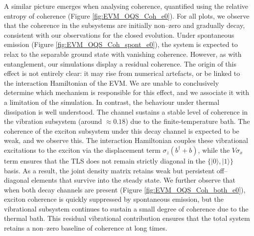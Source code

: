 \documentclass[11pt]{article}
\begin{document}
A similar picture emerges when analysing coherence, quantified using the relative entropy of coherence (Figure \ref{fig:EVM_OQS_Coh_e0}). For all plots, we observe that the coherence in the subsystems are initially non--zero and gradually decay, consistent with our observations for the closed evolution. Under spontaneous emission (Figure \ref{fig:EVM_OQS_Coh_spont_e0}), the system is expected to relax to the separable ground state with vanishing coherence. However, as with entanglement, our simulations display a residual coherence. The origin of this effect is not entirely clear: it may rise from numerical artefacts, or be linked to the interaction Hamiltonian of the EVM. We are unable to conclusively determine which mechanism is responsible for this effect, and we associate it with a limitation of the simulation. In contrast, the behaviour under thermal dissipation is well understood. The channel sustains a stable level of coherence in the vibration subsystem (around $\approx 0.18$) due to the finite-temperature bath. The coherence of the exciton subsystem under this decay channel is expected to be weak, and we observe this. The interaction Hamiltonian couples these vibrational excitations to the exciton via the displacement term $\sigma_z(b^\dagger+b)$, while the $V\sigma_x$ term ensures that the TLS does not remain strictly diagonal in the $\{{|0\rangle,|1\rangle}\}$ basis. As a result, the joint density matrix retains weak but persistent off--diagonal elements that survive into the steady state. We further observe that when both decay channels are present (Figure \ref{fig:EVM_OQS_Coh_both_e0}), exciton coherence is quickly suppressed by spontaneous emission, but the vibrational subsystem continues to sustain a small degree of coherence due to the thermal bath. This residual vibrational contribution ensures that the total system retains a non–zero baseline of coherence at long times.
\end{document}
